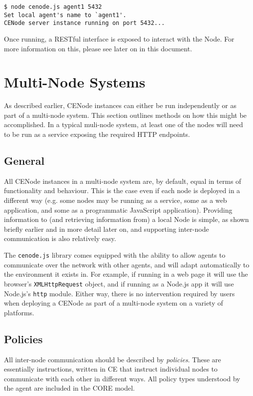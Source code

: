 \documentclass{article}
\begin{document}
\begin{verbatim}
$ node cenode.js agent1 5432
Set local agent's name to `agent1'.
CENode server instance running on port 5432...
\end{verbatim}

Once running, a RESTful interface is exposed to interact with the Node. For more information on this, please see later on in this document.

\section{Multi-Node Systems}
As described earlier, CENode instances can either be run independently or as part of a multi-node system. This section outlines methods on how this might be accomplished. In a typical muli-node system, at least one of the nodes will need to be run as a service exposing the required HTTP endpoints.

\subsection{General}
All CENode instances in a multi-node system are, by default, equal in terms of functionality and behaviour. This is the case even if each node is deployed in a different way (e.g. some nodes may be running as a service, some as a web application, and some as a programmatic JavaScript application). Providing information to (and retrieving information from) a local Node is simple, as shown briefly earlier and in more detail later on, and supporting inter-node communication is also relatively easy.

The \texttt{cenode.js} library comes equipped with the ability to allow agents to communicate over the network with other agents, and will adapt automatically to the environment it exists in. For example, if running in a web page it will use the browser's \texttt{XMLHttpRequest} object, and if running as a Node.js app it will use Node.js's \texttt{http} module. Either way, there is no intervention required by users when deploying a CENode as part of a multi-node system on a variety of platforms.


\subsection{Policies}
All inter-node communication should be described by \textit{policies}. These are essentially instructions, written in CE that instruct individual nodes to communicate with each other in different ways. All policy types understood by the agent are included in the CORE model.\\
\end{document}
